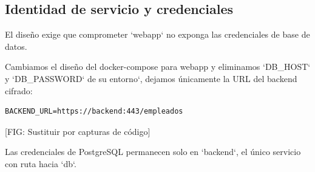\documentclass[11pt,spanish,listoffigures,listoftables]{tfgetsinf}
\begin{document}
        \subsection{Identidad de servicio y credenciales}
        El diseño exige que comprometer `webapp` no exponga las credenciales de base de datos.
        
        Cambiamos el diseño del docker-compose para webapp y eliminamos `DB\_HOST` y `DB\_PASSWORD` de su entorno`, dejamos únicamente la URL del backend cifrado:
        
        \begin{lstlisting}
BACKEND_URL=https://backend:443/empleados
        \end{lstlisting}
        [FIG: Sustituir por capturas de código]
        
        Las credenciales de PostgreSQL permanecen solo en `backend`, el único servicio con ruta hacia `db`. 
        
\end{document}
